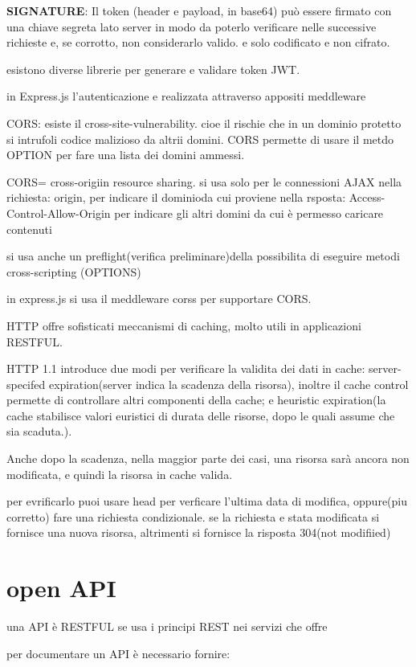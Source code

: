 \documentclass[12pt]{article}
\begin{document}
\textbf{SIGNATURE}: Il token (header e payload, in base64) può essere
firmato con una chiave segreta lato server in modo da
poterlo verificare nelle successive richieste e, se
corrotto, non considerarlo valido. e solo codificato e non cifrato.

esistono diverse librerie per generare e validare token JWT.

in Express.js l'autenticazione e realizzata attraverso appositi meddleware

CORS: esiste il cross-site-vulnerability. cioe il rischie che in un dominio protetto si intrufoli codice malizioso da altrii domini.
CORS permette di usare il metdo OPTION per fare una lista dei domini ammessi.

CORS= cross-origiin resource sharing.
si usa solo per le connessioni AJAX
nella richiesta: origin, per indicare il dominioda cui proviene
nella rsposta: Access-Control-Allow-Origin per indicare gli altri
domini da cui è permesso caricare contenuti

si usa anche un preflight(verifica preliminare)della possibilita di eseguire metodi cross-scripting (OPTIONS)

in express.js si usa il meddleware corss per supportare CORS.

HTTP offre sofisticati meccanismi di caching, molto utili in
applicazioni RESTFUL.

HTTP 1.1 introduce due modi per verificare la validita dei dati in cache: server-specifed expiration(server indica la scadenza della risorsa), inoltre il cache control permette di controllare altri componenti della cache; e heuristic expiration(la cache stabilisce valori euristici di durata delle
risorse, dopo le quali assume che sia scaduta.).

Anche dopo la scadenza, nella maggior parte dei casi, una
risorsa sarà ancora non modificata, e quindi la risorsa in cache
valida.

per evrificarlo puoi usare head per verficare l'ultima data di modifica, oppure(piu corretto) fare una richiesta condizionale. se la richiesta e stata modificata si fornisce una nuova risorsa, altrimenti si fornisce la risposta 304(not modifiied)

\section{open API}

una API è RESTFUL se usa i principi REST nei servizi che offre

per documentare un API è necessario fornire:
\end{document}
